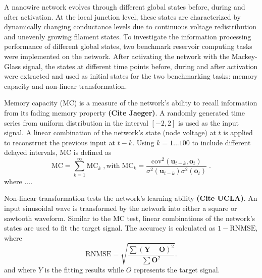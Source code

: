 \documentclass[fleqn,10pt,  reprint, amsmath,amssymb,aps, floatfix]{wlscirep}
\begin{document}


A nanowire network evolves through different global states before, during and after activation. At the local junction level, these states are characterized by dynamically changing conductance levels due to continuous voltage redistribution and unevenly growing filament states. To investigate the information processing performance of different global states, two benchmark reservoir computing tasks were implemented on the network. After activating the network with the Mackey-Glass signal, the states at different time points before, during and after activation were extracted and used as initial states for the two benchmarking tasks: memory capacity and non-linear transformation. 

Memory capacity (MC) is a measure of the network's ability to recall information from its fading memory property \textbf{(Cite Jaeger)}. 
A randomly generated time series from uniform distribution in the interval $[-2,2]$ is used as the input signal. A linear combination of the network's state (node voltage) at $t$ is applied to reconstruct the previous input at $t - k$. Using $k = 1 ... 100$ to include different delayed intervals, MC is defined as
\begin{equation}
	\text{MC} = \sum \limits_{k=1}^\infty \text{MC}_k
	\; , \mbox{with} \; 
	\text{MC}_k = \dfrac{\text{cov}^2(\mathbf u_{t-k}, \mathbf o_t)}{\sigma^2 (\mathbf u_{t-k}) \sigma^2 (\mathbf o_t)} \; .
\end{equation}
where ....

Non-linear transformation tests the network's learning ability \textbf{(Cite UCLA)}.
An input sinusoidal wave is transformed by the network into either a square or sawtooth waveform. Similar to the MC test, linear combinations of the network's states are used to fit the target signal. The accuracy is calculated as $1 - \text{RNMSE}$, where
\begin{equation}
	\text{RNMSE} = \sqrt{\dfrac{\sum (\mathbf Y - \mathbf O)^2}{\sum \mathbf O^2}}.
\end{equation}
and where $Y$ is the fitting results while $O$ represents the target signal.
\end{document}

